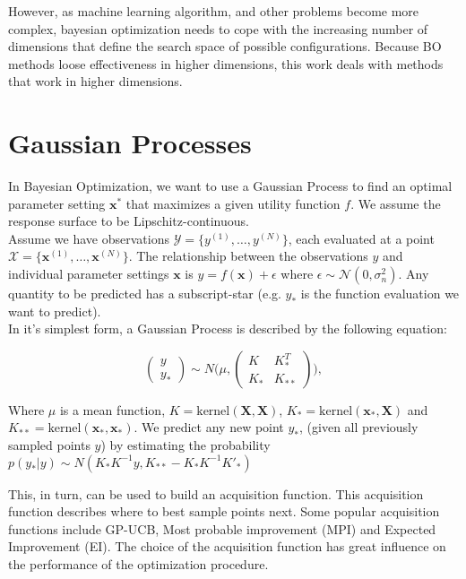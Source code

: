 However, as machine learning algorithm, and other problems become more complex, bayesian optimization needs to cope with the increasing number of dimensions that define the search space of possible configurations.
Because BO methods loose effectiveness in higher dimensions, this work deals with methods that work in higher dimensions.

\section{Gaussian Processes}
In Bayesian Optimization, we want to use a Gaussian Process to find an optimal parameter setting $\mathbf{x^*}$ that maximizes a given utility function $f$.
We assume the response surface to be Lipschitz-continuous. \\

Assume we have observations $ \mathcal{Y} = \{ y^{(1)}, \ldots, y^{(N)} \}$, each evaluated at a point $ \mathcal{X} = \{  \mathbf{x}^{(1)}, \ldots, \mathbf{x}^{(N)} \}$.
The relationship between the observations $y$ and individual parameter settings $\mathbf{x}$ is $y = f \left( \mathbf{x} \right) + \epsilon$ where $\epsilon \sim  \mathcal{N} \left( 0, \sigma^2_n \right)$. Any quantity to be predicted has a subscript-star (e.g. $y_*$ is the function evaluation we want to predict).\\

In it's simplest form, a Gaussian Process is described by the following equation:

\begin{equation}
\begin{pmatrix} y \\
y_* \end{pmatrix} \sim N\Biggl(\mu,\begin{pmatrix} K & K^T_*\\
 K_* & K_{**} \end{pmatrix}\Biggr),
\end{equation}

Where $\mu$ is a mean function, $K = \text{kernel}(\mathbf{X}, \mathbf{X})$, $K_* = \text{kernel}(\mathbf{x_*}, \mathbf{X})$ and $K_{**} = \text{kernel}(\mathbf{x_*}, \mathbf{x_*})$.
We predict any new point $y_*$, (given all previously sampled points $y$) by estimating the probability $ p(y_*|y) \sim N(K_*K^{-1}y,K_{**}-K_*K^{-1}K'_*) $

This, in turn, can be used to build an acquisition function. 
This acquisition function describes where to best sample points next.
Some popular acquisition functions include GP-UCB, Most probable improvement (MPI) and Expected Improvement (EI).
The choice of the acquisition function has great influence on the performance of the optimization procedure.\\

